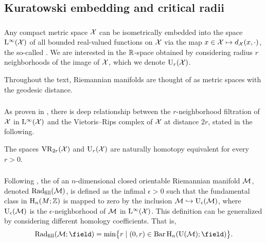 

\subsection{Kuratowski embedding and critical radii}\label{sub:filling radii}

\subsubsection{}

Any compact metric space $\mathcal{X}$ can be isometrically embedded into the space $\mathrm{L}^\infty(\mathcal{X})$ of all bounded real-valued functions on $\mathcal{X}$ via the map $x \in \mathcal{X} \mapsto d_{\mathcal{X}}(x,\cdot)$, the so-called .
We are interested in the \(\mathbb{R}\)-space obtained by considering radius \(r\) neighborhoods of the image of \(\mathcal{X}\), which we denote \(\mathrm{U}_r(\mathcal{X})\).

Throughout the text, Riemannian manifolds are thought of as metric spaces with the geodesic distance.

\subsubsection{}\label{ss:kuratowski_vr}

As proven in \cite[Thm.~4.1]{lim2024vietoris}, there is deep relationship between the \(r\)-neighborhood filtration of $\mathcal{X}$ in $\mathrm{L}^\infty(\mathcal{X})$ and the Vietoris--Rips complex of \(\mathcal{X}\) at distance \(2r\), stated in the following.

\medskip\lemma The spaces $\mathrm{VR}_{2r}(\mathcal{X})$ and $\mathrm{U}_r(\mathcal{X})$ are naturally homotopy equivalent for every \(r > 0\).

\subsubsection{}

Following \cite{gromov1983filling}, the  of an \(n\)-dimensional closed orientable Riemannian manifold $\mathcal{M}$, denoted \(\mathrm{Rad}_{\mathrm{fill}}(\mathcal{M})\), is defined as the infimal $\epsilon > 0$ such that the fundamental class in $\mathrm{H}_n(M; \mathbb{Z})$ is mapped to zero by the inclusion $\mathcal{M} \hookrightarrow \mathrm{U}_\epsilon(\mathcal{M})$, where \(\mathrm{U}_\epsilon(\mathcal{M})\) is the \(\epsilon\)-neighborhood of \(\mathcal{M}\) in \(\mathrm{L}^\infty(\mathcal{X})\).
This definition can be generalized by considering different homology coefficients.
That is,
\[
\fillrad(\cM; \field) = \min\set[\big]{r \mid (0, r) \in \barc \rH_n(\rU(\cM); \field)}.
\]

